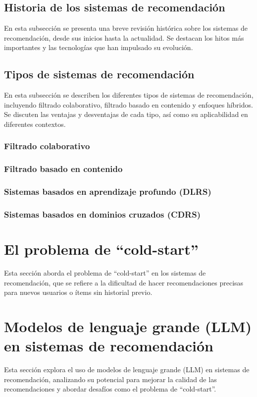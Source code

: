 	\subsection{Historia de los sistemas de recomendación}
	En esta subsección se presenta una breve revisión histórica sobre los sistemas de recomendación, desde sus inicios hasta la actualidad. Se destacan los hitos más importantes y las tecnologías que han impulsado su evolución.

	\subsection{Tipos de sistemas de recomendación}
	En esta subsección se describen los diferentes tipos de sistemas de recomendación, incluyendo filtrado colaborativo, filtrado basado en contenido y enfoques híbridos. Se discuten las ventajas y desventajas de cada tipo, así como su aplicabilidad en diferentes contextos.

		\subsubsection{Filtrado colaborativo}

		\subsubsection{Filtrado basado en contenido}
		
		\subsubsection{Sistemas basados en aprendizaje profundo (DLRS)}
		
		\subsubsection{Sistemas basados en dominios cruzados (CDRS)}

\section{El problema de \enquote{cold-start}}

	Esta sección aborda el problema de \enquote{cold-start} en los sistemas de recomendación, que se refiere a la dificultad de hacer recomendaciones precisas para nuevos usuarios o ítems sin historial previo.

\section{Modelos de lenguaje grande (LLM) en sistemas de recomendación}

	Esta sección explora el uso de modelos de lenguaje grande (LLM) en sistemas de recomendación, analizando su potencial para mejorar la calidad de las recomendaciones y abordar desafíos como el problema de \enquote{cold-start}.

